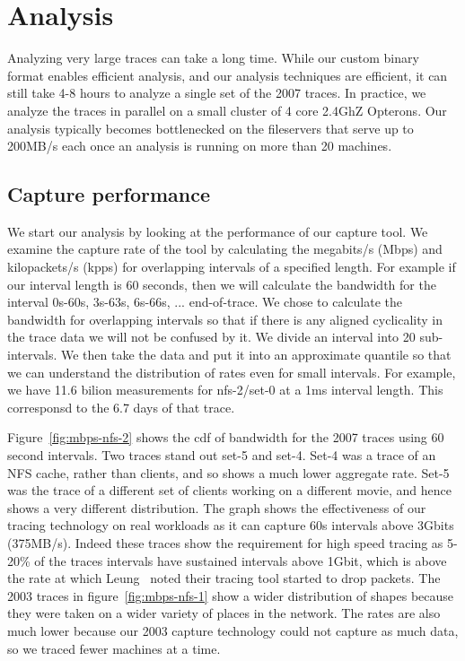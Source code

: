 \section{Analysis}

Analyzing very large traces can take a long time.  While our custom
binary format enables efficient analysis, and our analysis techniques
are efficient, it can still take 4-8 hours to analyze a single set of
the 2007 traces.  In practice, we analyze the traces in parallel on a
small cluster of 4 core 2.4GhZ Opterons.  Our analysis typically
becomes bottlenecked on the fileservers that serve up to 200MB/s each
once an analysis is running on more than 20 machines.

\subsection{Capture performance}

We start our analysis by looking at the performance of our capture
tool.  We examine the capture rate of the tool by calculating the
megabits/s (Mbps) and kilopackets/s (kpps) for overlapping intervals
of a specified length.  For example if our interval length is 60
seconds, then we will calculate the bandwidth for the interval 0s-60s,
3s-63s, 6s-66s, ... end-of-trace.  We chose to calculate the bandwidth
for overlapping intervals so that if there is any aligned cyclicality
in the trace data we will not be confused by it.  We divide an
interval into 20 sub-intervals.  We then take the data and put it into
an approximate quantile so that we can understand the distribution of
rates even for small intervals.  For example, we have 11.6 bilion
measurements for nfs-2/set-0 at a 1ms interval length.  This
corresponsd to the 6.7 days of that trace.

Figure~\ref{fig:mbps-nfs-2} shows the cdf of bandwidth for the 2007
traces using 60 second intervals.  Two traces stand out set-5 and
set-4.  Set-4 was a trace of an NFS cache, rather than clients, and so
shows a much lower aggregate rate.  Set-5 was the trace of a different
set of clients working on a different movie, and hence shows a very
different distribution.  The graph shows the effectiveness of our
tracing technology on real workloads as it can capture 60s intervals
above 3Gbits (375MB/s).  Indeed these traces show the requirement for
high speed tracing as 5-20\% of the traces intervals have sustained
intervals above 1Gbit, which is above the rate at which
Leung~\cite{LeungUsenix08} noted their tracing tool started to drop
packets.  The 2003 traces in figure~\ref{fig:mbps-nfs-1} show a wider
distribution of shapes because they were taken on a wider variety of
places in the network.  The rates are also much lower because our 2003
capture technology could not capture as much data, so we traced fewer
machines at a time.

